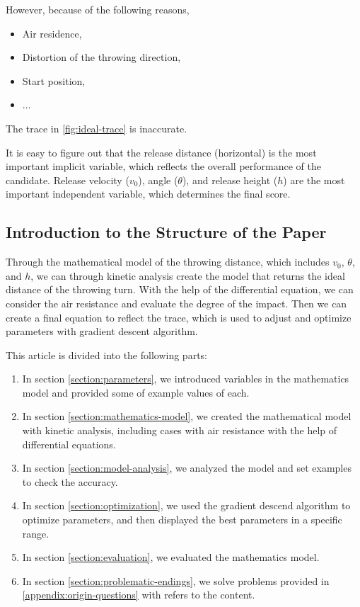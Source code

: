 \documentclass{article}
\begin{document}
However, because of the following reasons,

\begin{itemize}
    \item Air residence,
    \item Distortion of the throwing direction,
    \item Start position,
    \item $\dots$
\end{itemize}

The trace in \ref{fig:ideal-trace} is inaccurate.

It is easy to figure out that the release distance (horizontal) is the most important implicit variable, which reflects the overall performance of the candidate. Release velocity ($v_0$), angle ($\theta$), and release height ($h$) are the most important independent variable, which determines the final score.

\subsection{Introduction to the Structure of the Paper}

Through the mathematical model of the throwing distance, which includes $v_0$, $\theta$, and $h$, we can through kinetic analysis create the model that returns the ideal distance of the throwing turn. With the help of the differential equation, we can consider the air resistance and evaluate the degree of the impact. Then we can create a final equation to reflect the trace, which is used to adjust and optimize parameters with gradient descent algorithm.

This article is divided into the following parts:

\begin{enumerate}
    \item In section \ref{section:parameters}, we introduced variables in the mathematics model and provided some of example values of each.
    \item In section \ref{section:mathematics-model}, we created the mathematical model with kinetic analysis, including cases with air resistance with the help of differential equations.
    \item In section \ref{section:model-analysis}, we analyzed the model and set examples to check the accuracy.
    \item In section \ref{section:optimization}, we used the gradient descend algorithm to optimize parameters, and then displayed the best parameters in a specific range.
    \item In section \ref{section:evaluation}, we evaluated the mathematics model.
    \item In section \ref{section:problematic-endings}, we solve problems provided in \ref{appendix:origin-questions} with refers to the content.
\end{enumerate}
\end{document}
